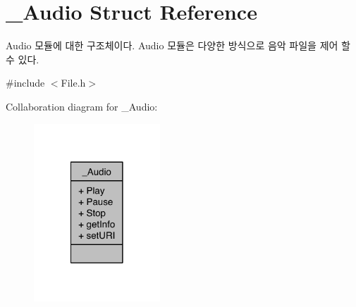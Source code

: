 \hypertarget{struct__Audio}{\section{\-\_\-\-Audio Struct Reference}
\label{struct__Audio}
}


Audio 모듈에 대한 구조체이다. Audio 모듈은 다양한 방식으로 음악 파일을 제어 할 수 있다.  




{\ttfamily \#include $<$File.\-h$>$}



Collaboration diagram for \-\_\-\-Audio\-:\nopagebreak
\begin{figure}[H]
\begin{center}
\leavevmode
\includegraphics[width=134pt]{d0/d7a/struct__Audio__coll__graph}
\end{center}
\end{figure}
